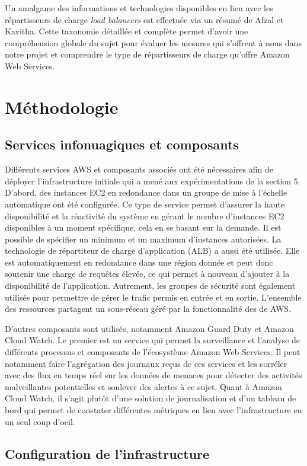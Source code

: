 \documentclass[conference]{IEEEtran}
\begin{document}
Un amalgame des informations et technologies disponibles en lien avec les répartisseurs de charge \textit{load balancers} est effectuée via un résumé de Afzal et Kavitha. Cette taxonomie détaillée et complète permet d'avoir une compréhension globale du sujet pour évaluer les mesures qui s'offrent à nous dans notre projet et comprendre le type de répartisseurs de charge qu'offre Amazon Web Services.\section{Méthodologie}

\subsection{Services infonuagiques et composants}
Différents services AWS et composants associés ont été nécessaires afin de déployer l’infrastructure initiale qui a mené aux expérimentations de la section 5. D’abord, des instances EC2 en redondance dans un groupe de mise à l’échelle automatique ont été configurée. Ce type de service permet d’assurer la haute disponibilité et la réactivité du système en gérant le nombre d’instances EC2 disponibles à un moment spécifique, cela en se basant sur la demande. Il est possible de spécifier un minimum et un maximum d’instances autorisées. La technologie de répartiteur de charge d’application (ALB) a aussi été utilisée. Elle est automatiquement en redondance dans une région donnée et peut donc soutenir une charge de requêtes élevée, ce qui permet à nouveau d’ajouter à la disponibilité de l’application. Autrement, les groupes de sécurité sont également utilisés pour permettre de gérer le trafic permis en entrée et en sortie. L’ensemble des ressources partagent un sous-réseau géré par la fonctionnalité des  de AWS.


D’autres composants sont utilisés, notamment Amazon Guard Duty et Amazon Cloud Watch. Le premier est un service qui permet la surveillance et l’analyse de différents processus et composants de l’écosystème Amazon Web Services. Il peut notamment faire l’agrégation des journaux reçus de ces services et les corréler avec des flux en temps réel sur les données de menaces pour détecter des activités malveillantes potentielles et soulever des alertes à ce sujet. Quant à Amazon Cloud Watch, il s’agit plutôt d’une solution de journalisation et d’un tableau de bord qui permet de constater différentes métriques en lien avec l’infrastructure en un seul coup d’oeil.
\subsection{Configuration de l'infrastructure}
\end{document}

